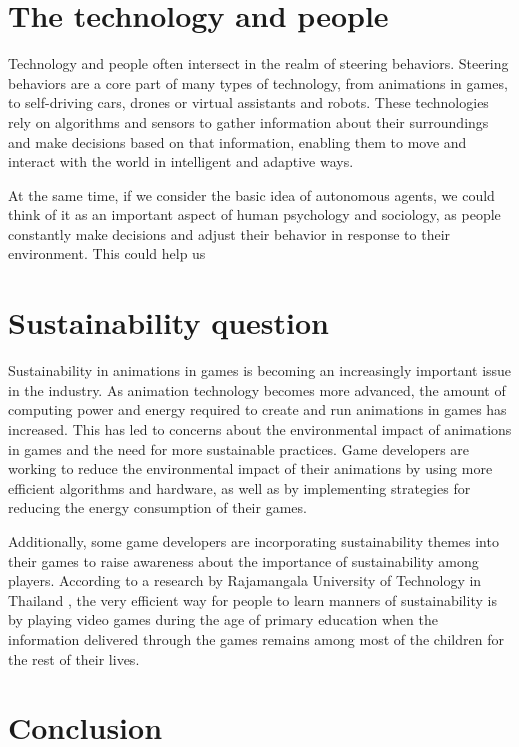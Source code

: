 \documentclass[10pt,twoside,english,a4paper]{article}
\begin{document}
\section{The technology and people} \label{technology and people} 

Technology and people often intersect in the realm of steering behaviors.
Steering behaviors are a core part of many types of technology, from animations in games,
to self-driving cars, drones or virtual assistants and robots. 
These technologies rely on algorithms and sensors to gather information about 
their surroundings and make decisions based 
on that information, enabling them to move and interact with the world 
in intelligent and adaptive ways. 

At the same time, if we consider the basic idea of autonomous agents,
we could think of it as an important aspect of human psychology and sociology, as 
people constantly make decisions and adjust their behavior in response to their 
environment. This could help us 

\section{Sustainability question} \label{sustainability} 

Sustainability in animations in games is becoming an increasingly important 
issue in the industry. As animation technology becomes more advanced, the amount 
of computing power and energy required to create and run animations in games has 
increased. This has led to concerns about the environmental impact of animations 
in games and the need for more sustainable practices. 
Game developers are working to reduce the environmental impact of their animations
by using more efficient 
algorithms and hardware, as well as by implementing strategies for reducing the 
energy consumption of their games. 

Additionally, some game developers are 
incorporating sustainability themes into their games to raise awareness about 
the importance of sustainability among players. 
According to a research by
Rajamangala University of Technology in Thailand \cite{phong}, the very efficient way for 
people to learn manners of sustainability is by playing video games during 
the age of primary education when the information delivered through the games 
remains among most of the children for the rest of their lives.

\section{Conclusion} \label{conclusion}
\end{document}
